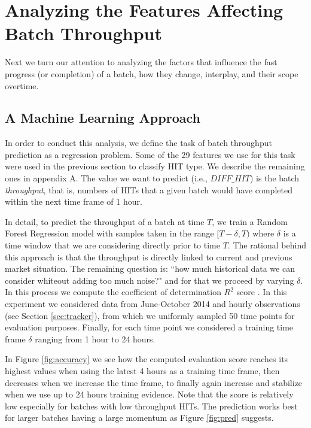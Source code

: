 \section{Analyzing the Features Affecting Batch Throughput}
\label{sec:throughput}
Next we turn our attention to analyzing the factors that influence the fast progress (or completion) of a batch, how they change, interplay, and their scope overtime.
\subsection{A Machine Learning Approach}
In order to conduct this analysis, we define the task of batch throughput prediction as a regression problem.  Some of the  29  features we use for this task were used in the previous section to classify HIT type.  We describe the remaining ones in appendix A. The value  we want to predict (i.e.,   $DIFF\_HIT$) is the batch \emph{throughput}, that is, numbers of HITs that  a given batch would have completed within the next time frame of 1 hour.

In detail, to predict the throughput of a batch at time $T$, we train a Random Forest Regression model with samples taken in the range $[T-\delta, T)$ where $\delta$ is a time window that we are   considering directly prior to time $T$. The rational behind this approach is that the throughput is directly linked to current and previous market situation. 
The remaining question is: ``how much historical data we can consider whiteout adding too much noise?" and for that we proceed by varying $\delta$.
In this process we compute the coefficient of determination  $R^2$ score \cite{sklearnweb, sklearn}.
In this experiment we considered  data from June-October 2014 and hourly observations (see Section \ref{sec:tracker}), from which we uniformly sampled 50 time points for evaluation purposes. Finally, for each time point we considered a training time frame $\delta$ ranging from 1 hour to 24 hours. 

In Figure \ref{fig:accuracy} we see how the computed evaluation score reaches its highest values when using the latest 4 hours as a training time frame, then decreases when we increase the time frame, to finally again increase and stabilize when we use up to 24 hours training evidence.
Note that the score is relatively low especially for batches with low throughput HITs. The prediction works best for larger batches having a large momentum as Figure \ref{fig:pred} suggests.

